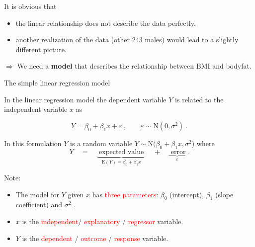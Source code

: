 \documentclass[10pt,ignorenonframetext,]{beamer}
\providecommand{\tightlist}{%
  \setlength{\itemsep}{0pt}\setlength{\parskip}{0pt}}
\begin{document}
\begin{frame}

It is obvious that

\begin{itemize}
\tightlist
\item
  the linear relationship does not describe the data perfectly.
\item
  another realization of the data (other 243 males) would lead to a
  slightly different picture.
\end{itemize}

\vspace{4mm} \(\Rightarrow\) We need a \textbf{model} that describes the
relationship between BMI and bodyfat.

\end{frame}

\begin{frame}

\begin{block}{The simple linear regression model}

\vspace{3mm}

In the linear regression model the dependent variable \(Y\) is related
to the independent variable \(x\) as

\[Y = \beta_0 + \beta_1 x + \varepsilon \ , \qquad \varepsilon \sim \text{N}(0,\sigma^2) \ .\]
\vspace{2mm}

In this formulation \(Y\) is a random variable
\(Y \sim \text{N}(\beta_0 + \beta_1 x, \sigma^2\)) where
\[Y \quad= \quad \underbrace{\text{ expected value }}_{\text{E}(Y) = \beta_0 + \beta_1 x} \quad + \quad \underbrace{\text{ error}}_{\varepsilon}  \ .\]

Note:

\begin{itemize}
\tightlist
\item
  The model for \(Y\) given \(x\) has \textcolor{red}{three parameters}:
  \(\beta_0\) (intercept), \(\beta_1\) (slope coefficient) and
  \(\sigma^2\) .
\item
  \(x\) is the \textcolor{red}{independent}/
  \textcolor{red}{explanatory} / \textcolor{red}{regressor} variable.
\item
  \(Y\) is the \textcolor{red}{dependent} / \textcolor{red}{outcome} /
  \textcolor{red}{response} variable.
\end{itemize}

\end{block}

\end{frame}
\end{document}
